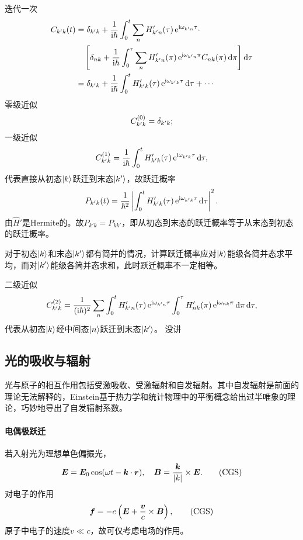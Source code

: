 迭代一次
\begin{align*}
	C_{k'k}(t)&=\vd_{k'k}+\frac1{\i\hbar}\int_0^t\sum_nH'_{k'n}(\tau)\e{\i\omega_{k'n}\tau}\cdot\\
	&\quad\fkh{\vd_{nk}+\frac1{\i\hbar}\int_0^\tau\sum_nH'_{k'n}(\pi)\e{\i\omega_{k'n}\pi}C_{nk}(\pi)\d\pi}\d\tau\\
	&=\vd_{k'k}+\frac1{\i\hbar}\int_0^tH'_{k'k}(\tau)\e{\i\omega_{k'k}\tau}\d\tau+\cdots
\end{align*}
零级近似
\[
C_{k'k}^{(0)}=\mathop{}\!\delta_{k'k};
\]
一级近似 
\[
C_{k'k}^{(1)}=\frac1{\mathrm{i}\hbar}\int_0^tH'_{k'k}(\tau)\mathop{}\!\mathrm{e}^{\mathrm{i}\omega_{k'k}\tau}\mathop{}\!\mathrm{d}\tau,
\]
代表直接从初态$\left\vert k\right\rangle$跃迁到末态$\left\vert k'\right\rangle$，故跃迁概率
\begin{align}
	P_{k'k}(t)=\frac1{\hbar^2}\left\lvert\int_0^tH'_{k'k}(\tau)\mathop{}\!\mathrm{e}^{\mathrm{i}\omega_{k'k}\tau}\mathop{}\!\mathrm{d}\tau\right\rvert^2.
\end{align}
由$\hat H'$是Hermite的。故$P_{k'k}=P_{kk'}$，即从初态到末态的跃迁概率等于从末态到初态的跃迁概率。

对于初态$\left\vert k\right\rangle$和末态$\left\vert k'\right\rangle$都有简并的情况，计算跃迁概率应对$\left\vert k\right\rangle$能级各简并态求平均，而对$\left\vert k'\right\rangle$能级各简并态求和，此时跃迁概率不一定相等。

二级近似
\[
C_{k'k}^{(2)}=\frac1{(\mathrm{i}\hbar)^2}\sum_n\int_0^tH'_{k'n}(\tau)\mathop{}\!\mathrm{e}^{\mathrm{i}\omega_{k'n}\tau}\int_0^\tau H'_{nk}(\pi)\mathop{}\!\mathrm{e}^{\mathrm{i}\omega_{nk}\pi}\mathop{}\!\mathrm{d}\pi\mathop{}\!\mathrm{d}\tau,
\]
代表从初态$\left\vert k\right\rangle$经中间态$\left\vert n\right\rangle$跃迁到末态$\left\vert k'\right\rangle$。
没讲
\subsection{光的吸收与辐射}
光与原子的相互作用包括受激吸收、受激辐射和自发辐射。其中自发辐射是前面的理论无法解释的，Einstein基于热力学和统计物理中的平衡概念给出过半唯象的理论，巧妙地导出了自发辐射系数。
\paragraph*{电偶极跃迁}若入射光为理想单色偏振光，
\[
	\bm E=\bm E_0\cos(\omega t-\bm k\cdot\bm r),\quad\bm B=\frac{\bm k}{\abs k}\times\bm E.\CGS
\]
对电子的作用 
\[
	\bm f=-e\kh{\bm E+\frac{\bm v}c\times\bm B},\CGS
\]
原子中电子的速度$v\ll c$，故可仅考虑电场的作用。

